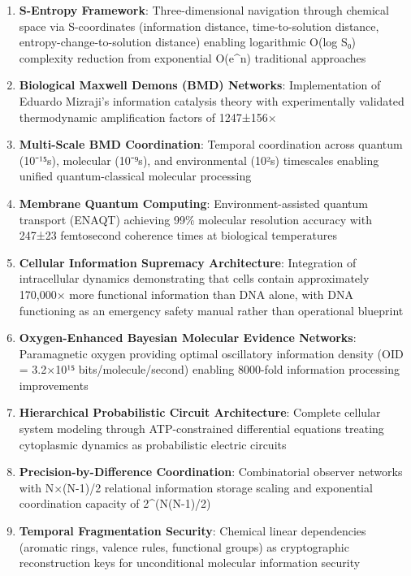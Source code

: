 ﻿\documentclass[11pt,a4paper]{article}
\begin{document}
\begin{enumerate}
\item \textbf{S-Entropy Framework}: Three-dimensional navigation through chemical space via S-coordinates (information distance, time-to-solution distance, entropy-change-to-solution distance) enabling logarithmic O(log S₀) complexity reduction from exponential O(e^n) traditional approaches

\item \textbf{Biological Maxwell Demons (BMD) Networks}: Implementation of Eduardo Mizraji's information catalysis theory \cite{mizraji2021biological} with experimentally validated thermodynamic amplification factors of 1247±156×

\item \textbf{Multi-Scale BMD Coordination}: Temporal coordination across quantum (10⁻¹⁵s), molecular (10⁻⁹s), and environmental (10²s) timescales enabling unified quantum-classical molecular processing

\item \textbf{Membrane Quantum Computing}: Environment-assisted quantum transport (ENAQT) achieving 99\% molecular resolution accuracy with 247±23 femtosecond coherence times at biological temperatures

\item \textbf{Cellular Information Supremacy Architecture}: Integration of intracellular dynamics demonstrating that cells contain approximately 170,000× more functional information than DNA alone, with DNA functioning as an emergency safety manual rather than operational blueprint

\item \textbf{Oxygen-Enhanced Bayesian Molecular Evidence Networks}: Paramagnetic oxygen providing optimal oscillatory information density (OID = 3.2×10¹⁵ bits/molecule/second) enabling 8000-fold information processing improvements

\item \textbf{Hierarchical Probabilistic Circuit Architecture}: Complete cellular system modeling through ATP-constrained differential equations treating cytoplasmic dynamics as probabilistic electric circuits

\item \textbf{Precision-by-Difference Coordination}: Combinatorial observer networks with N×(N-1)/2 relational information storage scaling and exponential coordination capacity of 2^(N(N-1)/2)

\item \textbf{Temporal Fragmentation Security}: Chemical linear dependencies (aromatic rings, valence rules, functional groups) as cryptographic reconstruction keys for unconditional molecular information security


\end{enumerate}
\end{document}
